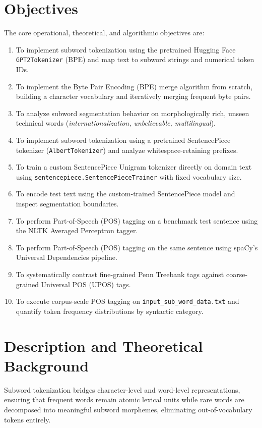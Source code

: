 \documentclass[12pt,a4paper]{report}
\begin{document}
\section{Objectives}
The core operational, theoretical, and algorithmic objectives are:
\begin{enumerate}[label=\textbf{\arabic*.}]
    \item To implement subword tokenization using the pretrained Hugging Face \texttt{GPT2Tokenizer} (BPE) and map text to subword strings and numerical token IDs.
    \item To implement the Byte Pair Encoding (BPE) merge algorithm from scratch, building a character vocabulary and iteratively merging frequent byte pairs.
    \item To analyze subword segmentation behavior on morphologically rich, unseen technical words (\textit{internationalization, unbelievable, multilingual}).
    \item To implement subword tokenization using a pretrained SentencePiece tokenizer (\texttt{AlbertTokenizer}) and analyze whitespace-retaining prefixes.
    \item To train a custom SentencePiece Unigram tokenizer directly on domain text using \texttt{sentencepiece.SentencePieceTrainer} with fixed vocabulary size.
    \item To encode test text using the custom-trained SentencePiece model and inspect segmentation boundaries.
    \item To perform Part-of-Speech (POS) tagging on a benchmark test sentence using the NLTK Averaged Perceptron tagger.
    \item To perform Part-of-Speech (POS) tagging on the same sentence using spaCy's Universal Dependencies pipeline.
    \item To systematically contrast fine-grained Penn Treebank tags against coarse-grained Universal POS (UPOS) tags.
    \item To execute corpus-scale POS tagging on \texttt{input\_sub\_word\_data.txt} and quantify token frequency distributions by syntactic category.
\end{enumerate}

\section{Description and Theoretical Background}
Subword tokenization bridges character-level and word-level representations, ensuring that frequent words remain atomic lexical units while rare words are decomposed into meaningful subword morphemes, eliminating out-of-vocabulary tokens entirely.
\end{document}
